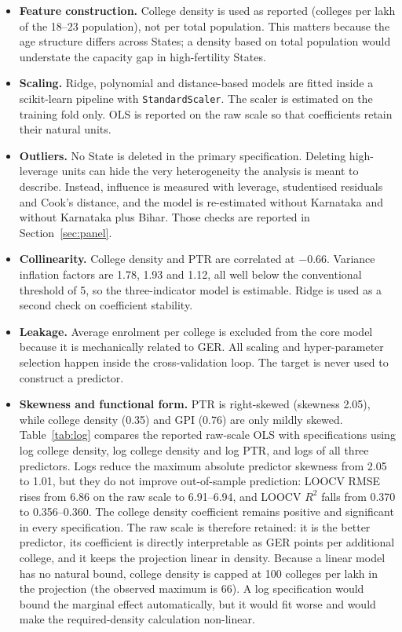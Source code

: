 \begin{itemize}
  \item \textbf{Feature construction.} College density is used as reported (colleges per lakh of the 18--23 population), not per total population. This matters because the age structure differs across States; a density based on total population would understate the capacity gap in high-fertility States.
  \item \textbf{Scaling.} Ridge, polynomial and distance-based models are fitted inside a scikit-learn pipeline with \texttt{StandardScaler}. The scaler is estimated on the training fold only. OLS is reported on the raw scale so that coefficients retain their natural units.
  \item \textbf{Outliers.} No State is deleted in the primary specification. Deleting high-leverage units can hide the very heterogeneity the analysis is meant to describe. Instead, influence is measured with leverage, studentised residuals and Cook's distance, and the model is re-estimated without Karnataka and without Karnataka plus Bihar. Those checks are reported in Section~\ref{sec:panel}.
  \item \textbf{Collinearity.} College density and PTR are correlated at $-0.66$. Variance inflation factors are 1.78, 1.93 and 1.12, all well below the conventional threshold of 5, so the three-indicator model is estimable. Ridge is used as a second check on coefficient stability.
  \item \textbf{Leakage.} Average enrolment per college is excluded from the core model because it is mechanically related to GER. All scaling and hyper-parameter selection happen inside the cross-validation loop. The target is never used to construct a predictor.
  \item \textbf{Skewness and functional form.} PTR is right-skewed (skewness 2.05), while college density (0.35) and GPI (0.76) are only mildly skewed. Table~\ref{tab:log} compares the reported raw-scale OLS with specifications using log college density, log college density and log PTR, and logs of all three predictors. Logs reduce the maximum absolute predictor skewness from 2.05 to 1.01, but they do not improve out-of-sample prediction: LOOCV RMSE rises from 6.86 on the raw scale to 6.91--6.94, and LOOCV $R^2$ falls from 0.370 to 0.356--0.360. The college density coefficient remains positive and significant in every specification. The raw scale is therefore retained: it is the better predictor, its coefficient is directly interpretable as GER points per additional college, and it keeps the projection linear in density. Because a linear model has no natural bound, college density is capped at 100 colleges per lakh in the projection (the observed maximum is 66). A log specification would bound the marginal effect automatically, but it would fit worse and would make the required-density calculation non-linear.
\end{itemize}

